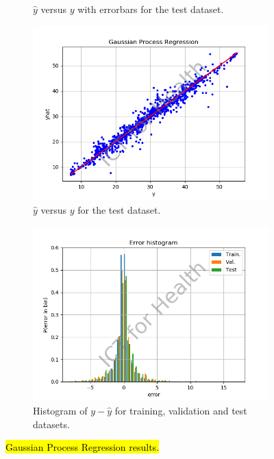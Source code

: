 \documentclass[12pt]{article}
\begin{document}
\begin{figure}
\begin{subfigure}{0.45\textwidth}
\caption{$\hat{y}$ versus $y$ with errorbars for the test dataset.}
\label{fig:GPR_regr_err}
\end{subfigure}
\begin{subfigure}{0.45\textwidth}
\includegraphics[width=\textwidth]{GP_regression.png}  
\caption{$\hat{y}$ versus $y$ for the test dataset.}
\label{fig:GPR_regr}
\end{subfigure}
\begin{subfigure}{0.45\textwidth}
\includegraphics[width=\textwidth]{GP_error_hist.png} \caption{Histogram of $y-\hat{y}$ for training, validation and test datasets.}
\label{fig:GPR_hist}
\end{subfigure}
\caption{\hl{Gaussian Process Regression results.}}
\label{fig:GPR}
\end{figure}
\end{document}
